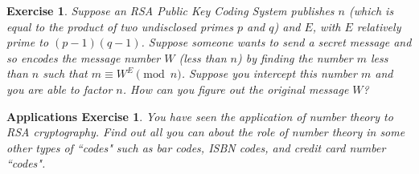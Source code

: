 \documentclass[11pt,leqno]{article}
\newtheorem{exer}[thm]{Exercise}
\newtheorem{apex}[thm]{Applications Exercise}
\theoremstyle{definition}
\begin{document}
\begin{exer}
Suppose an RSA Public Key Coding System publishes $n$ (which is
equal to the product of two undisclosed primes $p$ and $q$) and $E$,
with $E$ relatively prime to $(p-1)(q-1)$. Suppose someone wants to
send a secret message and so encodes the message number $W$ (less
than $n$) by finding the number $m$ less than $n$ such that
$m\equiv W^E\pmod{n}$. Suppose you intercept this number $m$ and you
are able to factor $n$. How can you figure out the original message
$W$?
\end{exer}

\begin{apex}
You have seen the application of number theory to RSA cryptography.
Find out all you can about the role of number theory in some other
types of ``codes" such as bar codes, ISBN codes, and credit card
number ``codes".
\end{apex}

\end{document}
